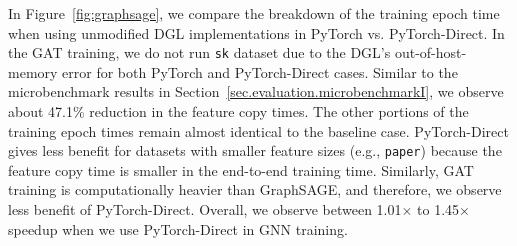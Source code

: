 In Figure~\ref{fig:graphsage}, we compare the breakdown of the training epoch time when using unmodified DGL implementations in PyTorch vs. PyTorch-Direct.
In the GAT training, we do not run \texttt{sk} dataset due to the DGL's out-of-host-memory error for both PyTorch and PyTorch-Direct cases.
Similar to the microbenchmark results in Section~\ref{sec.evaluation.microbenchmarkI}, we observe about 47.1\% reduction in the feature copy times.
The other portions of the training epoch times remain almost identical to the baseline case.
PyTorch-Direct gives less benefit for datasets with smaller feature sizes (e.g., \texttt{paper}) because the feature copy time is smaller in the end-to-end training time.
Similarly, GAT training is computationally heavier than GraphSAGE, and therefore, we observe less benefit of PyTorch-Direct.
Overall, we observe between 1.01$\times$ to 1.45$\times$ speedup when we use PyTorch-Direct in GNN training.
